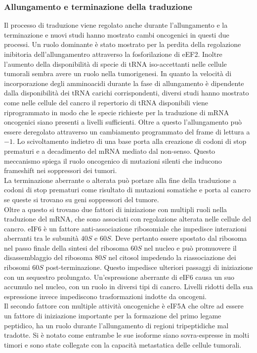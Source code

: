 		\subsubsection{Allungamento e terminazione della traduzione}
		Il processo di traduzione viene regolato anche durante l'allungamento e la terminazione e nuovi studi hanno mostrato cambi oncogenici in questi due processi.
		Un ruolo dominante \`e stato mostrato per la perdita della regolazione inibitoria dell'allungamentro attraverso la fosforilazione di eEF2.
		Inoltre l'aumento della disponibilit\`a di specie di tRNA iso-accettanti nelle cellule tumorali sembra avere un ruolo nella tumorigenesi.
		In quanto la velocit\`a di incorporazione degli amminoacidi durante la fase di allungamento \`e dipendente dalla disponibilit\`a dei tRNA carichi corrispondenti, diversi studi hanno mostrato come nelle cellule del cancro il repertorio di tRNA disponibili viene riprogrammato in modo che le specie richieste per la traduzione di mRNA oncogenici siano presenti a livelli sufficienti.
		Oltre a questo l'allungamento pu\`o essere deregolato attraverso un cambiamento programmato del frame di lettura a $-1$.
		Lo scivoltamento indietro di una base porta alla creazione di codoni di stop prematuri e a decadimento del mRNA mediato dal non-senso.
		Questo meccanismo spiega il ruolo oncogenico di mutazioni silenti che inducono frameshift nei soppressori dei tumori.\\
		La terminazione aberrante o alterata pu\`o portare alla fine della traduzione a codoni di stop prematuri come risultato di mutazioni somatiche e porta al cancro se queste si trovano su geni soppressori del tumore.\\
		Oltre a questo si trovano due fattori di iniziazione con multipli ruoli nella traduzione del mRNA, che sono associati con regolazione alterata nelle cellule del cancro.
		eIF6 \`e un fattore anti-associazione ribosomiale che impedisce interazioni aberranti tra le subunit\`a $40S$ e $60S$.
		Deve pertanto essere spostato dal ribosoma nel passo finale della sintesi del ribosoma $60S$ nel nucleo e pu\`o promuovere il disassemblaggio del ribosoma $80S$ nel citosol impedendo la riassociazione dei ribosomi $60S$ post-terminazione.
		Questo impedisce ulteriori passaggi di iniziazione con un sequestro prolungato.
		Un'espressione aberrante di eIF6 causa un suo accumulo nel nucleo, con un ruolo in diversi tipi di cancro.
		Livelli ridotti della sua espressione invece impediscono trasformazioni indotte da oncogeni.\\
		Il secondo fattore con multiple attivit\`a oncogeniche \`e eIF5A che oltre ad essere un fattore di iniziazione importante per la formazione del primo legame peptidico, ha un ruolo durante l'allungamento di regioni tripeptidiche mal tradotte.
		Si \`e notato come entrambe le sue isoforme siano sovra-espresse in molti timori e sono state collegate con la capacit\`a metastatica delle cellule tumorali.

